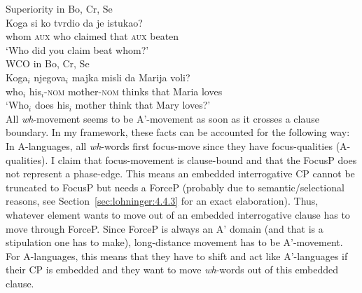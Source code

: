 \documentclass[output=paper,colorlinks,citecolor=brown]{langscibook}
\begin{document}
\ea 
  \ea\label{lohningerbcslong}
  {Superiority} in {Bo, Cr, Se} \citep[51]{richards1997}\\
    \gll * Koga si ko tvrdio da je istukao?\\
    {} whom \textsc{aux} who claimed that \textsc{aux} beaten\\
    \glt \hphantom{*} `Who did you claim beat whom?'\\
  \ex\label{lohningerbcslongwco}
  {WCO} in {Bo, Cr, Se} \citep[33]{richards1997}\\
    \gll * Koga$_{i}$ njegova$_{i}$ majka misli da Marija voli?\\
    {} who$_{i}$ his$_{i}$-\textsc{nom} mother-\textsc{nom} thinks that Maria loves\\
    \glt \hphantom{*} `Who$_{i}$ does his$_{i}$ mother think that Mary loves?'\\ 
  \z
\z 
All \textit{wh}-movement seems to be A'-movement as soon as it crosses a clause boundary. In my framework, these facts can be accounted for the following way: In A-languages, all \textit{wh}-words first focus-move since they have focus-qualities (A-qualities). I claim that focus-movement is clause-bound and that the FocusP does not represent a phase-edge. This means an embedded interrogative CP cannot be truncated to FocusP but needs a ForceP (probably due to semantic/selectional reasons, see Section~\ref{sec:lohninger:4.4.3} for an exact elaboration). Thus, whatever element wants to move out of an embedded interrogative clause has to move through ForceP. Since ForceP is always an A' domain (and that is a stipulation one has to make), long-distance movement has to be A'-movement. For A-languages, this means that they have to shift and act like A'-languages if their CP is embedded and they want to move \textit{wh}-words out of this embedded clause. 
\end{document}
